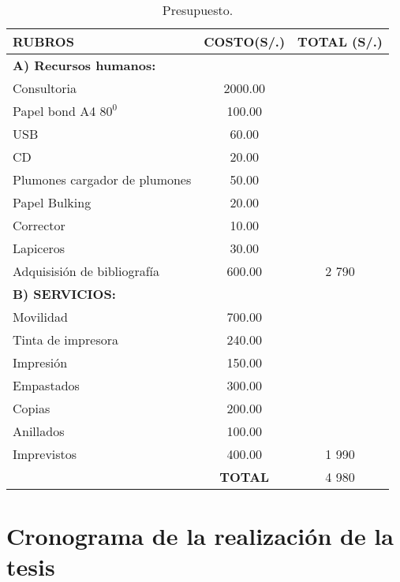\begin{table}[htb]
\centering
\begin{tabular}{|p{7cm}|c|c|}
\hline
\textbf{RUBROS} & \textbf{COSTO(S/.)}& \textbf{TOTAL (S/.)} \\ \hline
\textbf{A) Recursos humanos:} & & \\
Consultoria & 2000.00& \\
Papel bond A4 $80^0$ &100.00 & \\
USB &60.00&\\
CD &20.00&\\ 
 Plumones cargador de plumones&50.00&\\
Papel Bulking &20.00&\\ 
Corrector &10.00&\\
Lapiceros &30.00&\\
 Adquisisión de bibliografía &600.00& 2 790\\ \hline
\textbf{B) SERVICIOS:} &&\\
Movilidad &700.00& \\
Tinta de impresora &240.00& \\
Impresión &150.00 &\\
Empastados &300.00&\\
Copias &200.00&\\
Anillados &100.00&\\
Imprevistos &400.00& 1 990\\ \hline
& \textbf{TOTAL}& 4 980\\
 \hline
\end{tabular}
\caption{Presupuesto.}
\label{tabla:final}
\end{table}



\section{Cronograma de la realización de la tesis}

